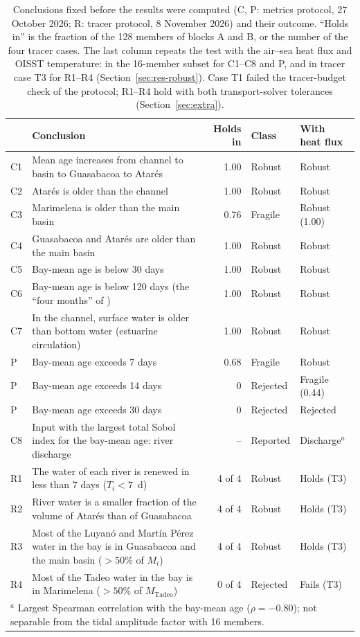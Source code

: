 \documentclass[a4paper,fleqn]{ems-dc}
\begin{document}
\begin{table}[!t]
\centering\small
\caption{Conclusions fixed before the results were computed (C, P: metrics protocol,
27 October 2026; R: tracer protocol, 8 November 2026) and their outcome. ``Holds in'' is the
fraction of the 128 members of blocks A and B, or the number of the four tracer cases. The
last column repeats the test with the air--sea heat flux and OISST temperature: in the
16-member subset for C1--C8 and P, and in tracer case T3 for R1--R4
(Section~\ref{sec:res-robust}). Case T1 failed the tracer-budget check of the protocol;
R1--R4 hold with both transport-solver tolerances (Section~\ref{sec:extra}).}\label{tab:concl}
\begin{tabular}{lp{9.6cm}rll}
\toprule
& Conclusion & Holds in & Class & With heat flux\\
\midrule
C1 & Mean age increases from channel to basin to Guasabacoa to Atar\'es & 1.00 & Robust & Robust\\
C2 & Atar\'es is older than the channel & 1.00 & Robust & Robust\\
C3 & Marimelena is older than the main basin & 0.76 & Fragile & Robust (1.00)\\
C4 & Guasabacoa and Atar\'es are older than the main basin & 1.00 & Robust & Robust\\
C5 & Bay-mean age is below 30 days & 1.00 & Robust & Robust\\
C6 & Bay-mean age is below 120 days (the ``four months'' of \citealt{JICA2004}) & 1.00 & Robust & Robust\\
C7 & In the channel, surface water is older than bottom water (estuarine circulation) & 1.00 & Robust & Robust\\
P & Bay-mean age exceeds 7 days & 0.68 & Fragile & Robust\\
P & Bay-mean age exceeds 14 days & 0 & Rejected & Fragile (0.44)\\
P & Bay-mean age exceeds 30 days & 0 & Rejected & Rejected\\
C8 & Input with the largest total Sobol index for the bay-mean age: river discharge & -- &
Reported & Discharge$^{a}$\\
\midrule
R1 & The water of each river is renewed in less than 7 days ($T_i < 7$~d) & 4 of 4 & Robust & Holds (T3)\\
R2 & River water is a smaller fraction of the volume of Atar\'es than of Guasabacoa & 4 of 4 & Robust & Holds (T3)\\
R3 & Most of the Luyan\'o and Mart\'in P\'erez water in the bay is in Guasabacoa and the
main basin ($>50$\% of $M_i$) & 4 of 4 & Robust & Holds (T3)\\
R4 & Most of the Tadeo water in the bay is in Marimelena ($>50$\% of $M_\mathrm{Tadeo}$) & 0 of 4 & Rejected & Fails (T3)\\
\bottomrule
\multicolumn{5}{l}{\footnotesize $^{a}$ Largest Spearman correlation with the bay-mean age
($\rho = -0.80$); not separable from the tidal amplitude factor with 16 members.}\\
\end{tabular}
\end{table}
\end{document}
